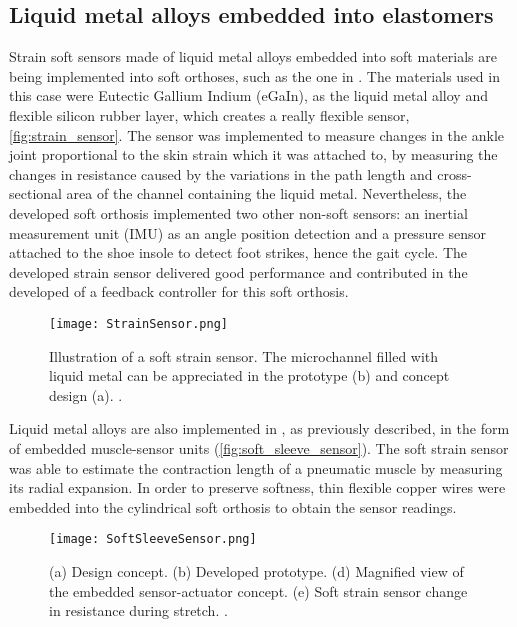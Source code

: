 \subsection{Liquid metal alloys embedded into elastomers}

Strain soft sensors made of liquid metal alloys embedded into soft materials are being implemented into soft orthoses, such as the one in \cite{park2011bio}. The materials used in this case were Eutectic Gallium Indium (eGaIn), as the liquid metal alloy and flexible silicon rubber layer, which creates a really flexible sensor, \autoref{fig:strain_sensor}. The sensor was implemented to measure changes in the ankle joint proportional to the skin strain which it was attached to, by measuring the changes in resistance caused by the variations in the path length and cross-sectional area of the channel containing the liquid metal. Nevertheless, the developed soft orthosis implemented two other non-soft sensors: an inertial measurement unit (IMU) as an angle position detection and a pressure sensor attached to the shoe insole to detect foot strikes, hence the gait cycle. The developed strain sensor delivered good performance and contributed in the developed of a feedback controller for this soft orthosis.

\begin{figure}[hbtp!]
    \centering
    \texttt{[image: StrainSensor.png]}
    \caption{Illustration of a soft strain sensor. The microchannel filled with liquid metal can be appreciated in the prototype (b) and concept design (a). \cite{park2011bio}. }
    \label{fig:strain_sensor}
\end{figure}

Liquid metal alloys are also implemented in \cite{Park2012}, as previously described, in the form of embedded muscle-sensor units (\autoref{fig:soft_sleeve_sensor}). The soft strain sensor was able to estimate the contraction length of a pneumatic muscle by measuring its radial expansion. In order to preserve softness, thin flexible copper wires were embedded into the cylindrical soft orthosis to obtain the sensor readings.

\begin{figure}[hbtp!]
    \centering
    \texttt{[image: SoftSleeveSensor.png]}
    \caption{(a) Design concept. (b) Developed prototype. (d) Magnified view of the embedded sensor-actuator concept. (e) Soft strain sensor change in resistance during stretch. \cite{Park2012}. }
    \label{fig:soft_sleeve_sensor}
\end{figure}


